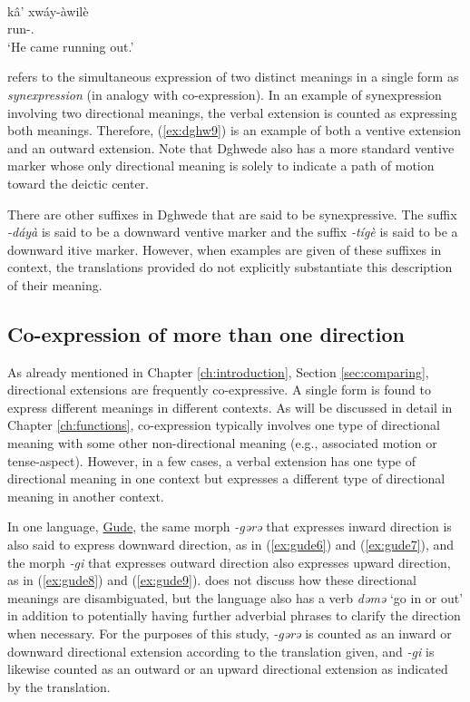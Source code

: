 \ea\label{ex:dghw9}
 \\
\gll kâ' xwáy-àwilè	\\
 run-. \\
\glt `He came running out.'
\z 

\citet{haspelmathCoexpressionSynexpressionPatterns2023} refers to the simultaneous expression of two distinct meanings in a single form as \textit{synexpression} (in analogy with co-expression). In an example of synexpression involving two directional meanings, the verbal extension is counted as expressing both meanings. Therefore, (\ref{ex:dghw9}) is an example of both a ventive extension and an outward extension. Note that Dghwede also has a more standard ventive marker whose only directional meaning is solely to indicate a path of motion toward the deictic center. 

There are other suffixes in Dghwede that are said to be synexpressive. The suffix \textit{-dáyà} is said to be a downward ventive marker and the suffix \textit{-tígè} is said to be a downward itive marker. However, when examples are given of these suffixes in context, the translations provided do not explicitly substantiate this description of their meaning.

\subsection{Co-expression of more than one direction} \label{sec:ambiguous}

As already mentioned in Chapter \ref{ch:introduction}, Section \ref{sec:comparing}, directional extensions are frequently co-expressive. A single form is found to express different meanings in different contexts. As will be discussed in detail in Chapter \ref{ch:functions}, co-expression typically involves one type of directional meaning with some other non-directional meaning (e.g., associated motion or tense-aspect). However, in a few cases, a verbal extension has one type of directional meaning in one context but expresses a different type of directional meaning in another context.

In one language, \hyperref[gude]{Gude}, the same morph \textit{-gərə} that expresses inward direction is also said to express downward direction, as in (\ref{ex:gude6}) and (\ref{ex:gude7}), and the morph \textit{-gi} that expresses outward direction also expresses upward direction, as in (\ref{ex:gude8}) and (\ref{ex:gude9}). \citet{hoskinsonGrammarDictionaryGude1983} does not discuss how these directional meanings are disambiguated, but the language also has a verb \textit{dəmə} `go in or out' in addition to potentially having further adverbial phrases to clarify the direction when necessary. For the purposes of this study, \textit{-gərə} is counted as an inward or downward directional extension according to the translation given, and \textit{-gi} is likewise counted as an outward or an upward directional extension as indicated by the translation.


